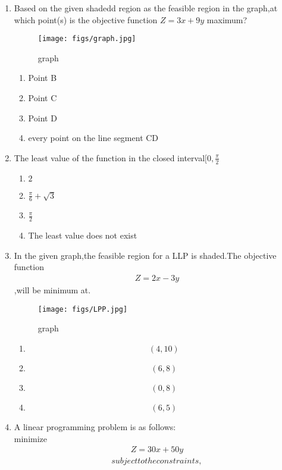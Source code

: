 \documentclass{article}
\begin{document}
\begin{enumerate}
	\item Based on the given shadedd region as the feasible region in the graph,at which point(s) is the objective function $Z=3x+9y$ maximum?
	\begin{figure}[H]
	\centering
		\texttt{[image: figs/graph.jpg]}
		\caption{graph}
		\label{fig:graph.jpg}
	\end{figure}
		\begin{enumerate}[label=(\Alph*)]
			\item Point B
			\item Point C
			\item Point D
			\item every point on the line segment CD
		\end{enumerate}
	\item The least value of the function  in the closed interval$[0,\frac{\pi}{2}$
		\begin{enumerate}[label=(\Alph*)]
			\item $2$
			\item $\frac{\pi}{6}+\sqrt{3}$
			\item $\frac{\pi}{2}$
			\item The least value does not exist
		\end{enumerate}
	\item In the given graph,the feasible region for a LLP is shaded.The objective function 
	\begin{align}
		Z = 2x-3y
	\end{align}
		,will be minimum at.
		\begin{figure}[H]
		\centering
			\texttt{[image: figs/LPP.jpg]}
			\caption{graph}
			\label{fig:LPP.jpg}
		\end{figure}
		\begin{enumerate}%
			\item $$(4,10)$$
			\item $$(6,8)$$
			\item $$(0,8)$$
			\item $$(6,5)$$
		\end{enumerate}
	\item A linear programming problem is as follows:
		\\
		minimize 
	\begin{align}
		Z = 30x+50y
	\end{align}
	\begin{align}
		subject to the constraints,
	\end{align}

\end{enumerate}
\end{document}
